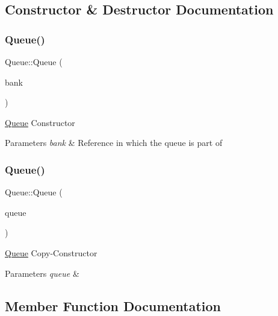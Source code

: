 \subsection{Constructor \& Destructor Documentation}
\mbox{\label{classQueue_ae2647f6001471e160dc95362aba43313}} 
\subsubsection{\texorpdfstring{Queue()}{Queue()}\hspace{0.1cm}{\footnotesize\ttfamily [1/2]}}
{\footnotesize\ttfamily Queue\+::\+Queue (\begin{DoxyParamCaption}\item[{\hyperlink{classBank}{Bank} \&}]{bank }\end{DoxyParamCaption})\hspace{0.3cm}{\ttfamily [explicit]}}

\hyperlink{classQueue}{Queue} Constructor 
\begin{DoxyParams}{Parameters}
{\em bank} & Reference in which the queue is part of \\
\hline
\end{DoxyParams}
\mbox{\label{classQueue_a4d325dcdfe0550824d529b7aa11535b8}} 
\subsubsection{\texorpdfstring{Queue()}{Queue()}\hspace{0.1cm}{\footnotesize\ttfamily [2/2]}}
{\footnotesize\ttfamily Queue\+::\+Queue (\begin{DoxyParamCaption}\item[{const \hyperlink{classQueue}{Queue} \&}]{queue }\end{DoxyParamCaption})}

\hyperlink{classQueue}{Queue} Copy-\/\+Constructor 
\begin{DoxyParams}{Parameters}
{\em queue} & \\
\hline
\end{DoxyParams}


\subsection{Member Function Documentation}
\mbox{\label{classQueue_aa4545b1d42237801b75e0f20c3cc0587}} 
